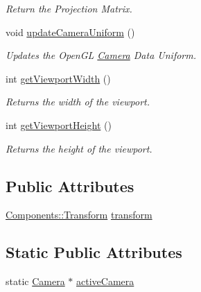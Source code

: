 \begin{DoxyCompactItemize}
\begin{DoxyCompactList}\small\item\em Return the Projection Matrix. \end{DoxyCompactList}\item 
void \hyperlink{class_cookie_eng_1_1_object_1_1_camera_a0b8a35f92490adf193d36f2906a2c1d8}{update\+Camera\+Uniform} ()
\begin{DoxyCompactList}\small\item\em Updates the Open\+GL \hyperlink{class_cookie_eng_1_1_object_1_1_camera}{Camera} Data Uniform. \end{DoxyCompactList}\item 
int \hyperlink{class_cookie_eng_1_1_object_1_1_camera_ae21ba7bbc237d0ddfac4d9531ba4597e}{get\+Viewport\+Width} ()
\begin{DoxyCompactList}\small\item\em Returns the width of the viewport. \end{DoxyCompactList}\item 
int \hyperlink{class_cookie_eng_1_1_object_1_1_camera_ad3cd942d665b97a64e19b68b5d0fe6fb}{get\+Viewport\+Height} ()
\begin{DoxyCompactList}\small\item\em Returns the height of the viewport. \end{DoxyCompactList}\end{DoxyCompactItemize}
\subsection*{Public Attributes}
\begin{DoxyCompactItemize}
\item 
\hyperlink{class_cookie_eng_1_1_components_1_1_transform}{Components\+::\+Transform} \hyperlink{class_cookie_eng_1_1_object_1_1_camera_aa996e685c79a71bd30e88341b68ed197}{transform}
\end{DoxyCompactItemize}
\subsection*{Static Public Attributes}
\begin{DoxyCompactItemize}
\item 
static \hyperlink{class_cookie_eng_1_1_object_1_1_camera}{Camera} $\ast$ \hyperlink{class_cookie_eng_1_1_object_1_1_camera_a552d79d05b0478c0ce92aa1d673ea1a7}{active\+Camera}
\end{DoxyCompactItemize}
